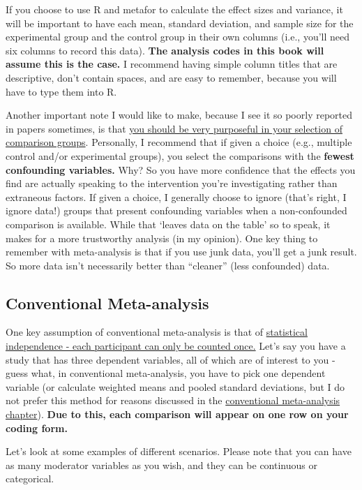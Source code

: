 \documentclass[
]{book}
\begin{document}
If you choose to use R and metafor to calculate the effect sizes and variance, it will be important to have each mean, standard deviation, and sample size for the experimental group and the control group in their own columns (i.e., you'll need six columns to record this data). \textbf{The analysis codes in this book will assume this is the case.} I recommend having simple column titles that are descriptive, don't contain spaces, and are easy to remember, because you will have to type them into R.

Another important note I would like to make, because I see it so poorly reported in papers sometimes, is that \ul{you should be very purposeful in your selection of comparison groups}. Personally, I recommend that if given a choice (e.g., multiple control and/or experimental groups), you select the comparisons with the \textbf{fewest confounding variables.} Why? So you have more confidence that the effects you find are actually speaking to the intervention you're investigating rather than extraneous factors. If given a choice, I generally choose to ignore (that's right, I ignore data!) groups that present confounding variables when a non-confounded comparison is available. While that `leaves data on the table' so to speak, it makes for a more trustworthy analysis (in my opinion). One key thing to remember with meta-analysis is that if you use junk data, you'll get a junk result. So more data isn't necessarily better than ``cleaner'' (less confounded) data.

\hypertarget{conventional-meta-analysis}{%
\subsection{Conventional Meta-analysis}\label{conventional-meta-analysis}}

One key assumption of conventional meta-analysis is that of \ul{statistical independence - each participant can only be counted once.} Let's say you have a study that has three dependent variables, all of which are of interest to you - guess what, in conventional meta-analysis, you have to pick one dependent variable (or calculate weighted means and pooled standard deviations, but I do not prefer this method for reasons discussed in the \protect\hyperlink{meta}{conventional meta-analysis chapter}). \textbf{Due to this, each comparison will appear on one row on your coding form.}

Let's look at some examples of different scenarios. Please note that you can have as many moderator variables as you wish, and they can be continuous or categorical.
\end{document}
